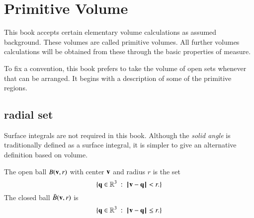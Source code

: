 


\section{Primitive Volume}
%

This book accepts
certain elementary volume calculations as assumed background.
These volumes are called primitive volumes.  
All further
volumes calculations will be obtained from these through the basic
properties of measure.   

To fix a convention, this book prefers to take the volume of open sets
whenever that can be arranged.  It begins with a description of some
of the primitive regions.

\subsection{radial set}\label{sec:solid}

Surface integrals are not required in this book.  Although
the {\it solid angle} is traditionally defined as a surface integral,
it is simpler to give an alternative definition based on volume.

\begin{definition}[ball]
 The open ball $B({\mathbf v},r)$ with center ${\mathbf v}$
and radius $r$ is the set
\begin{displaymath}
\{ \q\in\ring{R}^3 \mid \norm{\v}{\q} < r.\}
\end{displaymath}
The closed ball $\bar B({\mathbf v},r)$ is
\begin{displaymath}
\{ \q\in\ring{R}^3 \mid \norm{\v}{\q} \le r.\}
\end{displaymath}
%
%
%
\end{definition}

